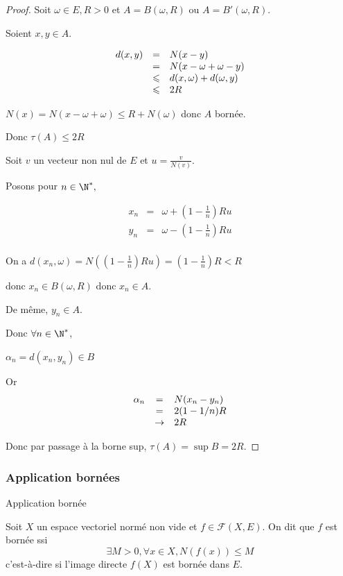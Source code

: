 \begin{proof}
    Soit $\omega \in E, R>0$ et $A = B(\omega, R)$ ou $A = B'(\omega, R)$. 

    Soient $x, y \in A$. 

    \[
    \begin{array}{rcl}
        d(x, y) & = & N(x - y) \\
        \space & = & N(x - \omega + \omega - y) \\
        \space & \leqslant & d(x, \omega) + d(\omega, y) \\
        \space & \leqslant & 2R \\
    \end{array}
    \]

    $N(x) = N(x - \omega + \omega) \leqslant R + N(\omega)$ donc $A$ bornée. 

    Donc $\tau(A) \leqslant 2R$

    Soit $v$ un vecteur non nul de $E$ et $u = \frac v {N(v)}$. 

    Posons pour $n \in \N^*,$

    \[
    \begin{array}{rcl}
        x_n & = & \omega + (1 - \frac 1 n) R u \\
        y_n & = & \omega - ( 1 - \frac 1 n) R u \\
    \end{array}
    \]

    On a $d(x_n, \omega) = N((1 - \frac 1 n)Ru) = ( 1 - \frac 1 n )R < R$

    donc $x_n \in B(\omega, R)$ donc $x_n \in A$. 

    De même, $y_n \in A$.

    Donc $\forall n \in \N^*$, 

    $\alpha_n = d(x_n, y_n) \in B$

    Or 
    \[
    \begin{array}{rcl}
        \alpha_n & = & N(x_n - y_n) \\
        \space & = & 2 (1 - 1 / n) R \\
        \space & \to & 2 R \\
    \end{array}
    \]

    Donc par passage à la borne sup, $\tau(A) = \sup B = 2R$.    
\end{proof}

\subsubsection{Application bornées}
\begin{definition}{Application bornée}{}

    Soit $X$ un espace vectoriel normé non vide et $f \in \mathscr F(X, E)$. 
    On dit que $f$ est bornée ssi
    \[\exists M > 0, \forall x \in X, N(f(x)) \leqslant M\]
    c'est-à-dire si l'image directe $f(X)$ est bornée dans $E$. 
\end{definition}

